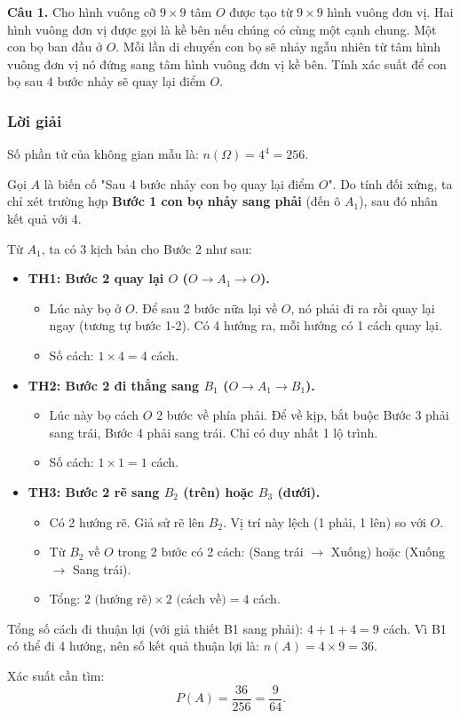 \documentclass[12pt]{article}
\begin{document}
\textbf{Câu 1.} Cho hình vuông cỡ $9 \times 9$ tâm $O$ được tạo từ $9 \times 9$ hình vuông đơn vị. Hai hình vuông đơn vị được gọi là kề bên nếu chúng có cùng một cạnh chung. Một con bọ ban đầu ở $O$. Mỗi lần di chuyển con bọ sẽ nhảy ngẫu nhiên từ tâm hình vuông đơn vị nó đứng sang tâm hình vuông đơn vị kề bên. Tính xác suất để con bọ sau 4 bước nhảy sẽ quay lại điểm $O$.

\subsubsection*{Lời giải}

Số phần tử của không gian mẫu là: $n(\Omega) = 4^4 = 256$.

Gọi $A$ là biến cố "Sau 4 bước nhảy con bọ quay lại điểm $O$". Do tính đối xứng, ta chỉ xét trường hợp \textbf{Bước 1 con bọ nhảy sang phải} (đến ô $A_1$), sau đó nhân kết quả với 4.

Từ $A_1$, ta có 3 kịch bản cho Bước 2 như sau:

\begin{itemize}
    \item \textbf{TH1: Bước 2 quay lại $O$ ($O \to A_1 \to O$).}
    \begin{itemize}
        \item Lúc này bọ ở $O$. Để sau 2 bước nữa lại về $O$, nó phải đi ra rồi quay lại ngay (tương tự bước 1-2). Có 4 hướng ra, mỗi hướng có 1 cách quay lại.
        \item Số cách: $1 \times 4 = 4$ cách.
    \end{itemize}

    \item \textbf{TH2: Bước 2 đi thẳng sang $B_1$ ($O \to A_1 \to B_1$).}
    \begin{itemize}
        \item Lúc này bọ cách $O$ 2 bước về phía phải. Để về kịp, bắt buộc Bước 3 phải sang trái, Bước 4 phải sang trái. Chỉ có duy nhất 1 lộ trình.
        \item Số cách: $1 \times 1 = 1$ cách.
    \end{itemize}

    \item \textbf{TH3: Bước 2 rẽ sang $B_2$ (trên) hoặc $B_3$ (dưới).}
    \begin{itemize}
        \item Có 2 hướng rẽ. Giả sử rẽ lên $B_2$. Vị trí này lệch (1 phải, 1 lên) so với $O$.
        \item Từ $B_2$ về $O$ trong 2 bước có 2 cách: (Sang trái $\to$ Xuống) hoặc (Xuống $\to$ Sang trái).
        \item Tổng: $2 \text{ (hướng rẽ)} \times 2 \text{ (cách về)} = 4$ cách.
    \end{itemize}
\end{itemize}

Tổng số cách đi thuận lợi (với giả thiết B1 sang phải): $4 + 1 + 4 = 9$ cách.
Vì B1 có thể đi 4 hướng, nên số kết quả thuận lợi là: $n(A) = 4 \times 9 = 36$.

Xác suất cần tìm:
\[ P(A) = \frac{36}{256} = \frac{9}{64}. \]
\end{document}
